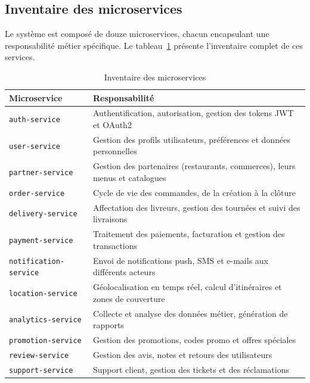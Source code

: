 \subsection{Inventaire des microservices}
\label{subsec:inventaire-microservices}

Le système est composé de douze microservices, chacun encapsulant une responsabilité métier spécifique. Le tableau~\ref{tab:inventaire-services} présente l'inventaire complet de ces services.

\begin{table}[H]
\centering
\caption{Inventaire des microservices}
\label{tab:inventaire-services}
\begin{tabular}{|l|p{8cm}|}
\hline
\rowcolor{gray!20}
\textbf{Microservice} & \textbf{Responsabilité} \\
\hline
\texttt{auth-service} & Authentification, autorisation, gestion des tokens JWT et OAuth2 \\
\hline
\texttt{user-service} & Gestion des profils utilisateurs, préférences et données personnelles \\
\hline
\texttt{partner-service} & Gestion des partenaires (restaurants, commerces), leurs menus et catalogues \\
\hline
\texttt{order-service} & Cycle de vie des commandes, de la création à la clôture \\
\hline
\texttt{delivery-service} & Affectation des livreurs, gestion des tournées et suivi des livraisons \\
\hline
\texttt{payment-service} & Traitement des paiements, facturation et gestion des transactions \\
\hline
\texttt{notification-service} & Envoi de notifications push, SMS et e-mails aux différents acteurs \\
\hline
\texttt{location-service} & Géolocalisation en temps réel, calcul d'itinéraires et zones de couverture \\
\hline
\texttt{analytics-service} & Collecte et analyse des données métier, génération de rapports \\
\hline
\texttt{promotion-service} & Gestion des promotions, codes promo et offres spéciales \\
\hline
\texttt{review-service} & Gestion des avis, notes et retours des utilisateurs \\
\hline
\texttt{support-service} & Support client, gestion des tickets et des réclamations \\
\hline
\end{tabular}
\end{table}


